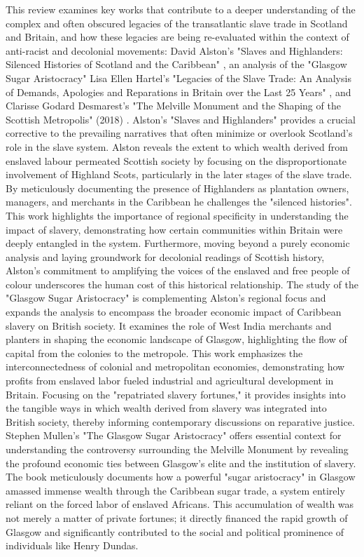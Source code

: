 \documentclass{scrartcl}
\begin{document}
This review examines key works that contribute to a deeper understanding of the complex and often obscured legacies of the transatlantic slave trade in Scotland and Britain, and how these legacies are being re-evaluated within the context of anti-racist and decolonial movements: David Alston's "Slaves and Highlanders: Silenced Histories of Scotland and the Caribbean" \cite{alston_2021}, an analysis of the "Glasgow Sugar Aristocracy" \cite{mullen_2022} Lisa Ellen Hartel's "Legacies of the Slave Trade: An Analysis of Demands, Apologies and Reparations in Britain over the Last 25 Years" \cite{hartel_2024} , and Clarisse Godard Desmarest's "The Melville Monument and the Shaping of the Scottish Metropolis" (2018) \cite{godard_2018}.
Alston's "Slaves and Highlanders" provides a crucial corrective to the prevailing narratives that often minimize or overlook Scotland's role in the slave system. 
Alston reveals the extent to which wealth derived from enslaved labour permeated Scottish society by focusing on the disproportionate involvement of Highland Scots, particularly in the later stages of the slave trade.
By meticulously documenting the presence of Highlanders as plantation owners, managers, and merchants in the Caribbean he challenges the "silenced histories".
This work highlights the importance of regional specificity in understanding the impact of slavery, demonstrating how certain communities within Britain were deeply entangled in the system.
 Furthermore, moving beyond a purely economic analysis and laying groundwork for decolonial readings of Scottish history, Alston's commitment to amplifying the voices of the enslaved and free people of colour underscores the human cost of this historical relationship.
The study of the "Glasgow Sugar Aristocracy" is complementing Alston's regional focus and expands the analysis to encompass the broader economic impact of Caribbean slavery on British society. It examines the role of West India merchants and planters in shaping the economic landscape of Glasgow, highlighting the flow of capital from the colonies to the metropole. This work emphasizes the interconnectedness of colonial and metropolitan economies, demonstrating how profits from enslaved labor fueled industrial and agricultural development in Britain. Focusing on the "repatriated slavery fortunes," it provides insights into the tangible ways in which wealth derived from slavery was integrated into British society, thereby informing contemporary discussions on reparative justice.
Stephen Mullen's "The Glasgow Sugar Aristocracy" offers essential context for understanding the controversy surrounding the Melville Monument by revealing the profound economic ties between Glasgow's elite and the institution of slavery. The book meticulously documents how a powerful "sugar aristocracy" in Glasgow amassed immense wealth through the Caribbean sugar trade, a system entirely reliant on the forced labor of enslaved Africans. This accumulation of wealth was not merely a matter of private fortunes; it directly financed the rapid growth of Glasgow and significantly contributed to the social and political prominence of individuals like Henry Dundas. 
\end{document}
